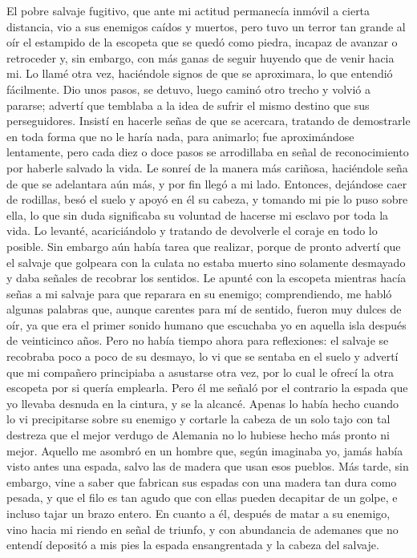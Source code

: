 \documentclass{novela}
\begin{document}
    El pobre salvaje fugitivo, que ante mi actitud permanecía inmóvil a cierta distancia, vio a sus enemigos caídos y muertos, pero tuvo un terror tan grande al oír el estampido de la escopeta que se quedó como piedra, incapaz de avanzar o retroceder y, sin embargo, con más ganas de seguir huyendo que de venir hacia mi. Lo llamé otra vez, haciéndole signos de que se aproximara, lo que entendió fácilmente. Dio unos pasos, se detuvo, luego caminó otro trecho y volvió a pararse; advertí que temblaba a la idea de sufrir el mismo destino que sus perseguidores. Insistí en hacerle señas de que se acercara, tratando de demostrarle en toda forma que no le haría nada, para animarlo; fue aproximándose lentamente, pero cada diez o doce pasos se arrodillaba en señal de reconocimiento por haberle salvado la vida. Le sonreí de la manera más cariñosa, haciéndole seña de que se adelantara aún más, y por fin llegó a mi lado.
    Entonces, dejándose caer de rodillas, besó el suelo y apoyó en él su cabeza, y tomando mi pie lo puso sobre ella, lo que sin duda significaba su voluntad de hacerse mi esclavo por toda la vida.
    Lo levanté, acariciándolo y tratando de devolverle el coraje en todo lo posible. Sin embargo aún había tarea que realizar, porque de pronto advertí que el salvaje que golpeara con la culata no estaba muerto sino solamente desmayado y daba señales de recobrar los sentidos. Le apunté con la escopeta mientras hacía señas a mi salvaje para que reparara en su enemigo; comprendiendo, me habló algunas palabras que, aunque carentes para mí de sentido, fueron muy dulces de oír, ya que era el primer sonido humano que escuchaba yo en aquella isla después de veinticinco años.
    Pero no había tiempo ahora para reflexiones: el salvaje se recobraba poco a poco de su desmayo, lo vi que se sentaba en el suelo y advertí que mi compañero principiaba a asustarse otra vez, por lo cual le ofrecí la otra escopeta por si quería emplearla. Pero él me señaló por el contrario la espada que yo llevaba desnuda en la cintura, y se la alcancé. Apenas lo había hecho cuando lo vi precipitarse sobre su enemigo y cortarle la cabeza de un solo tajo con tal destreza que el mejor verdugo de Alemania no lo hubiese hecho más pronto ni mejor.
    Aquello me asombró en un hombre que, según imaginaba yo, jamás había visto antes una espada, salvo las de madera que usan esos pueblos. Más tarde, sin embargo, vine a saber que fabrican sus espadas con una madera tan dura como pesada, y que el filo es tan agudo que con ellas pueden decapitar de un golpe, e incluso tajar un brazo entero.
    En cuanto a él, después de matar a su enemigo, vino hacia mi riendo en señal de triunfo, y con abundancia de ademanes que no entendí depositó a mis pies la espada ensangrentada y la cabeza del salvaje.
\end{document}
